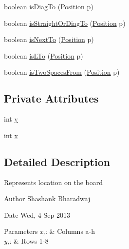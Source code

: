 \begin{DoxyCompactItemize}
\item 
boolean \hyperlink{classgame_1_1_position_a5cd53a853944e8cb4efcd4f439bdd1ab}{is\-Diag\-To} (\hyperlink{classgame_1_1_position}{Position} p)
\item 
boolean \hyperlink{classgame_1_1_position_a102a4057f6bc97e2f914fc9369770727}{is\-Straight\-Or\-Diag\-To} (\hyperlink{classgame_1_1_position}{Position} p)
\item 
boolean \hyperlink{classgame_1_1_position_ae31d424c5820d6cc5ed92326ad247c86}{is\-Next\-To} (\hyperlink{classgame_1_1_position}{Position} p)
\item 
boolean \hyperlink{classgame_1_1_position_aeb458be389f964686f2d30aca2ebbc26}{is\-L\-To} (\hyperlink{classgame_1_1_position}{Position} p)
\item 
boolean \hyperlink{classgame_1_1_position_a7f264329a355226c14160f5148d64aee}{is\-Two\-Spaces\-From} (\hyperlink{classgame_1_1_position}{Position} p)
\end{DoxyCompactItemize}
\subsection*{Private Attributes}
\begin{DoxyCompactItemize}
\item 
int \hyperlink{classgame_1_1_position_aa59625ace3e203e899d47f125388f751}{y}
\item 
int \hyperlink{classgame_1_1_position_a84cd22aa467b66df4e31bf76da2fbb48}{x}
\end{DoxyCompactItemize}


\subsection{Detailed Description}
Represents location on the board \begin{DoxyAuthor}{Author}
Shashank Bharadwaj 
\end{DoxyAuthor}
\begin{DoxyDate}{Date}
Wed, 4 Sep 2013
\end{DoxyDate}

\begin{DoxyParams}{Parameters}
{\em x,\-:} & Columns a-\/h \\
\hline
{\em y,\-:} & Rows 1-\/8 \\
\hline
\end{DoxyParams}


